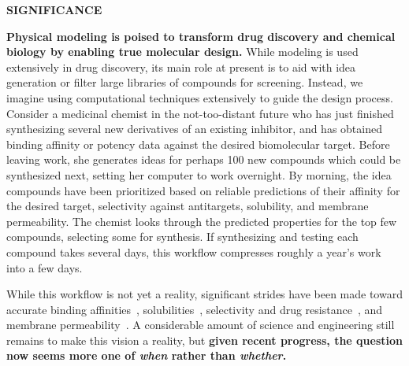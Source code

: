 \documentclass[11pt]{article}
\begin{document}




{\large \bf SIGNIFICANCE}

\textbf{Physical modeling is poised to transform drug discovery and chemical biology by enabling true molecular design.}
While modeling is used extensively in drug discovery, its main role at present is to aid with idea generation or filter large libraries of compounds for screening. 
Instead, we imagine using computational techniques extensively to guide the design process. 
Consider a medicinal chemist in the not-too-distant future who has just finished synthesizing several new derivatives of an existing inhibitor, and has obtained binding affinity or potency data against the desired biomolecular target. 
Before leaving work, she generates ideas for perhaps 100 new compounds which could be synthesized next, setting her computer to work overnight. 
By morning, the idea compounds have been prioritized based on reliable predictions of their affinity for the desired target, selectivity against antitargets, solubility, and membrane permeability.  
The chemist looks through the predicted properties for the top few compounds, selecting some for synthesis. 
If synthesizing and testing each compound takes several days, this workflow compresses roughly a year's work into a few days.

While this workflow is not yet a reality, significant strides have been made toward accurate binding affinities~\cite{mobley_perspective_2012, christ_accuracy_2014, deng_distinguishing_2015, sherborne_preprint_2016, schrodinger_accurate_2015, christ_binding_2016, cui_affinity_2016, verras_free_2016}, solubilities~\cite{Schnieders:2012:J.Chem.TheoryComput., park_absolute_2014, liu_using_2016}, selectivity and drug resistance~\cite{leonis_contribution_2013}, and membrane permeability~\cite{lee_permeability_2016, comer_permeability_2014}. 
A considerable amount of science and engineering still remains to make this vision a reality, but \textbf{given recent progress, the question now seems more one of \emph{when} rather than \emph{whether}.} 
\end{document}
